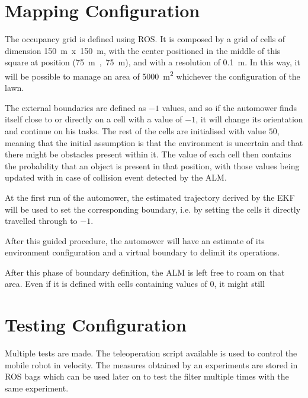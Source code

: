  
\section{Mapping Configuration}
\label{sec:locConf}

\noindent The occupancy grid is defined using \gls{ROS}. It is composed by a grid of cells of dimension \SI{150}{m}~x~\SI{150}{m}, with the center positioned in the middle of this square at position (\SI{75}{m}~,~\SI{75}{m}), and with a resolution of \SI{0.1}{m}. In this way, it will be possible to manage an area of \SI{5000}{m^2} whichever the configuration of the lawn.

The external boundaries are defined as $-1$ values, and so if the automower finds itself close to or directly on a cell with a value of $-1$, it will change its orientation and continue on his tasks.
The rest of the cells are initialised with value $50$, meaning that the initial assumption is that the environment is uncertain and that there might be obstacles present within it.
The value of each cell then contains the probability that an object is present in that position, with those values being updated with  in case of collision event detected by the \gls{ALM}.

At the first run of the automower, the estimated trajectory derived by the EKF will be used to set the corresponding boundary, i.e. by setting the cells it directly travelled through to $-1$. 

After this guided procedure, the automower will have an estimate of its environment configuration and a virtual boundary to delimit its operations.

After this phase of boundary definition, the \gls{ALM} is left free to roam on that area.
Even if it is defined with cells containing values of $0$, it might still



\section{Testing Configuration}


\label{sec:testing}
\noindent Multiple tests are made. 
The teleoperation script available is used to control the mobile robot in velocity.
The measures obtained by an experiments are stored in \gls{ROS} bags which can be used later on to test the filter multiple times with the same experiment.

